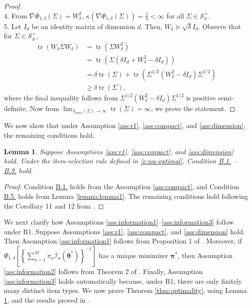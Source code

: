 \documentclass[12pt]{article}
\newcommand{\bfpi}{\boldsymbol{\pi}}
\newcommand{\bftheta}{\boldsymbol{\theta}}
\newtheorem{lemma}[theorem]{Lemma}
\begin{document}
\begin{proof}
\\ 4. From $\nabla \Phi_{1,\delta}(\Sigma) = W_{\delta}^2$, $\kappa(\nabla \Phi_{1,\delta}(\Sigma)) = \frac{1}{\delta} < \infty$ for all $\Sigma \in \mathcal{S}_{d}^+$.
\\ 5. Let $I_d$ be an identity matrix of dimension $d$. Then, $W_{\delta} \succeq \sqrt{\delta} I_d$. Observe that for $\Sigma \in \mathcal{S}_d^+$,
\begin{align*}
\operatorname{tr}( W_{\delta} \Sigma W_{\delta} ) &= \operatorname{tr}( \Sigma W_{\delta}^2) 
\\ &= \operatorname{tr}(\Sigma( \delta I_d + W_{\delta}^2 - \delta I_d) )
\\ &= \delta \operatorname{tr}(\Sigma) + \operatorname{tr}( \Sigma^{1/2} ( W_{\delta}^2 - \delta I_d) \Sigma^{1/2} )
\\ & \ge \delta \operatorname{tr}(\Sigma),
\end{align*}
where the final inequality follows from $\Sigma^{1/2} ( W_{\delta}^2 - \delta I_d) \Sigma^{1/2}$ is positive semi-definite. Now from $\lim_{\lambda_{max}(\Sigma) \to \infty} \operatorname{tr}(\Sigma) = \infty$, we prove the statement.
\end{proof}

We now show that under Assumption \ref{ass:r1}, \ref{ass:compact}, and \ref{ass:dimension}, the remaining conditions hold. 

\begin{lemma} \label{lemma:lemma2}
Suppose Assumptions \ref{ass:r1}, \ref{ass:compact}, and \ref{ass:dimension} hold. Under the item-selection rule defined in \eqref{e:wa-optimal}, Condition \hyperref[c:c1]{B.1.} --  \hyperref[c:c7b]{B.9.} hold.
\end{lemma}
\begin{proof}
Condition \hyperref[c:c1]{B.1.} holds from the Assumption \ref{ass:compact}, and Condition \hyperref[c:c5]{B.5.} holds from Lemma \ref{lemma:lemma1}. The remaining conditions hold following the Corollary 11 and 12 from .
\end{proof}

We next clarify how Assumptions \ref{ass:information1}–\ref{ass:information3} follow under R1. Suppose Assumptions \ref{ass:r1}, \ref{ass:compact}, and \ref{ass:dimension} hold. Then Assumption \ref{ass:information1} follows from Proposition 1 of . Moreover, if $\Phi_{1,\delta}\!\left[ \left\{\sum_{a=1}^{M}\pi_a\mathcal{I}_a(\bftheta^\ast)\right\}^{-1}\right]$
has a unique minimizer $\bfpi^\ast$, then Assumption \ref{ass:information2} follows from Theorem 2 of . Finally, Assumption \ref{ass:information3} holds automatically because, under R1, there are only finitely many distinct item types. We now prove Theorem \ref{thm:optimality}, using Lemma \ref{lemma:lemma2}, and the results proved in .
\end{document}

